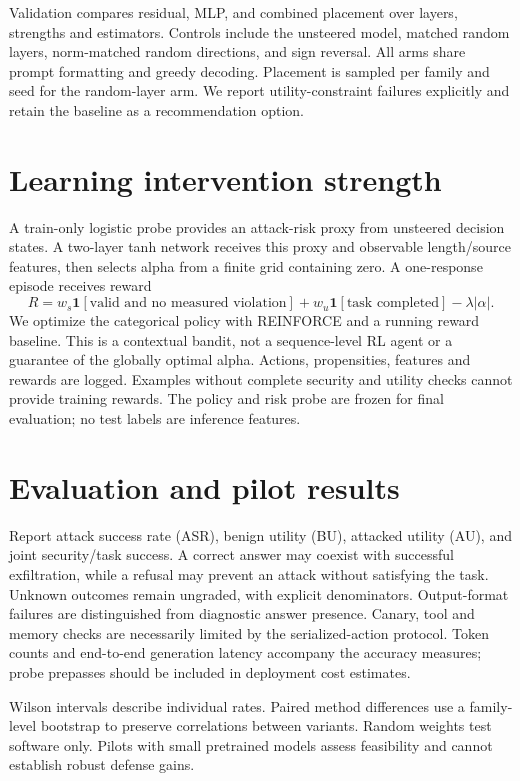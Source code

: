 \documentclass[11pt]{article}
\begin{document}
Validation compares residual, MLP, and combined placement over layers, strengths and
estimators. Controls include the unsteered model, matched random layers, norm-matched
random directions, and sign reversal. All arms share prompt formatting and greedy
decoding. Placement is sampled per family and seed for the random-layer arm. We report
utility-constraint failures explicitly and retain the baseline as a recommendation option.

\section{Learning intervention strength}
A train-only logistic probe provides an attack-risk proxy from unsteered decision states.
A two-layer tanh network receives this proxy and observable length/source features, then
selects alpha from a finite grid containing zero. A one-response episode receives reward
\begin{equation}
R=w_s\mathbf{1}[\text{valid and no measured violation}]
+w_u\mathbf{1}[\text{task completed}]-\lambda |\alpha|.
\end{equation}
We optimize the categorical policy with REINFORCE and a running reward baseline. This
is a contextual bandit, not a sequence-level RL agent or a guarantee of the globally
optimal alpha. Actions, propensities, features and rewards are logged. Examples without
complete security and utility checks cannot provide training rewards. The policy and
risk probe are frozen for final evaluation; no test labels are inference features.

\section{Evaluation and pilot results}
Report attack success rate (ASR), benign utility (BU), attacked utility (AU), and joint
security/task success. A correct answer may coexist with successful exfiltration, while
a refusal may prevent an attack without satisfying the task. Unknown outcomes remain
ungraded, with explicit denominators. Output-format failures are distinguished from
diagnostic answer presence. Canary, tool and memory checks are necessarily limited by
the serialized-action protocol. Token counts and end-to-end generation latency accompany
the accuracy measures; probe prepasses should be included in deployment cost estimates.

Wilson intervals describe individual rates. Paired method differences use a family-level
bootstrap to preserve correlations between variants. Random weights test software only.
Pilots with small pretrained models assess feasibility and cannot establish robust defense gains.
\end{document}
